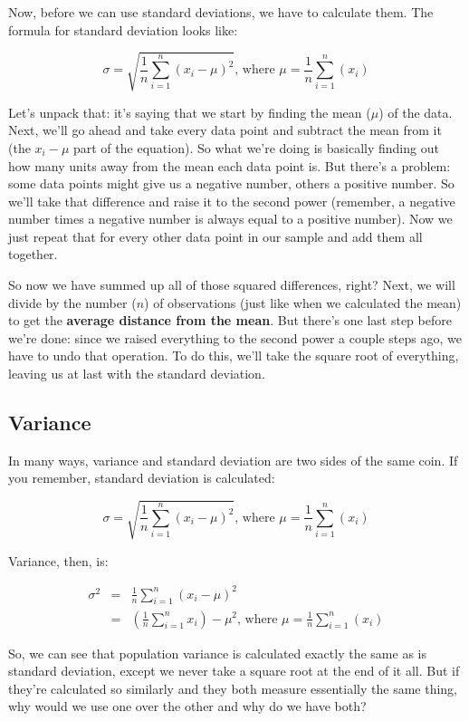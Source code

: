 Now, before we can use standard deviations, we have to calculate them. The formula for standard deviation looks like:

\begin{equation}
\sigma = \sqrt{
	\frac{1}{n}\sum_{i=1}^n\left(x_i-\mu\right)^2
	} \text{, where }
	\mu=\frac{1}{n}\sum_{i=1}^n(x_i)
\end{equation}

Let's unpack that: it's saying that we start by finding the mean (\( \mu \)) of the data. Next, we'll go ahead and take every data point and subtract the mean from it (the \( x_i-\mu \) part of the equation). So what we're doing is basically finding out how many units away from the mean each data point is. But there's a problem: some data points might give us a negative number, others a positive number. So we'll take that difference and raise it to the second power (remember, a negative number times a negative number is always equal to a positive number). Now we just repeat that for every other data point in our sample and add them all together.

So now we have summed up all of those squared differences, right? Next, we will divide by the number (\( n \)) of observations (just like when we calculated the mean) to get the \textbf{average distance from the mean}. But there's one last step before we're done: since we raised everything to the second power a couple steps ago, we have to undo that operation. To do this, we'll take the square root of everything, leaving us at last with the standard deviation.

\subsection{Variance}
In many ways, variance and standard deviation are two sides of the same coin. If you remember, standard deviation is calculated:

    \[ \sigma = \sqrt{\frac{1}{n}\sum_{i=1}^n\left(x_i-\mu\right)^2}\text{, where } \mu=\frac{1}{n}\sum_{i=1}^n(x_i) \]

Variance, then, is:

\begin{eqnarray*}
	\sigma^2 &=& \frac{1}{n}\sum_{i=1}^n\left(x_i-\mu\right)^2 \\
	&=& \left(\frac{1}{n}\sum_{i=1}^nx_i\right)-\mu^2\text{, where } \mu=\frac{1}{n}\sum_{i=1}^n(x_i)
\end{eqnarray*}

So, we can see that population variance is calculated exactly the same as is standard deviation, except we never take a square root at the end of it all. But if they're calculated so similarly and they both measure essentially the same thing, why would we use one over the other and why do we have both?

